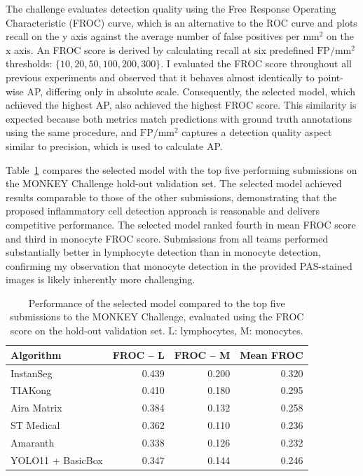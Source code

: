 The challenge evaluates detection quality using the Free Response Operating Characteristic (FROC) curve, which is an alternative to the ROC curve and plots recall on the y axis against the average number of false positives per $\mathrm{mm^2}$ on the x axis. An FROC score is derived by calculating recall at six predefined $\mathrm{FP/mm^2}$ thresholds: $\{10, 20, 50, 100, 200, 300\}$. I evaluated the FROC score throughout all previous experiments and observed that it behaves almost identically to point-wise AP, differing only in absolute scale. Consequently, the selected model, which achieved the highest AP, also achieved the highest FROC score. This similarity is expected because both metrics match predictions with ground truth annotations using the same procedure, and $\mathrm{FP/mm^2}$ captures a detection quality aspect similar to precision, which is used to calculate AP.

Table~\ref{tab:results} compares the selected model with the top five performing submissions on the MONKEY Challenge hold-out validation set. The selected model achieved results comparable to those of the other submissions, demonstrating that the proposed inflammatory cell detection approach is reasonable and delivers competitive performance. The selected model ranked fourth in mean FROC score and third in monocyte FROC score. Submissions from all teams performed substantially better in lymphocyte detection than in monocyte detection, confirming my observation that monocyte detection in the provided PAS-stained images is likely inherently more challenging.

\begin{table}
    \centering
    \begin{tabular}{lrrr}
        \toprule
        Algorithm & FROC -- L & FROC -- M & Mean FROC \\
        \midrule
        InstanSeg & 0.439 & 0.200 & 0.320 \\
        TIAKong~\cite{Lv2025} & 0.410 & 0.180 & 0.295 \\
        Aira Matrix~\cite{Deotale2025} & 0.384 & 0.132 & 0.258 \\
        ST Medical & 0.362 & 0.110 & 0.236 \\
        Amaranth & 0.338 & 0.126 & 0.232 \\
        \midrule
        YOLO11 + BasicBox & 0.347 & 0.144 & 0.246 \\
        \bottomrule
    \end{tabular}
    \caption{Performance of the selected model compared to the top five submissions to the MONKEY Challenge, evaluated using the FROC score on the hold-out validation set. L: lymphocytes, M: monocytes.}
    \label{tab:results}
\end{table}

